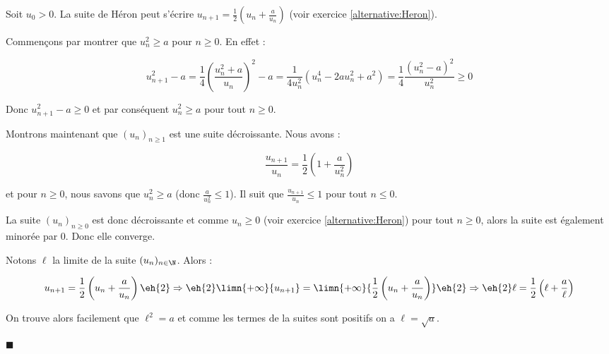\begin{demonstration}
\medskip
Soit $u_0>0.$ La suite de Héron peut s'écrire $u_{n+1} = \frac12 \left(u_n+\frac{a}{u_n}\right)$ {\small (voir exercice \ref*{alternative:Heron})}.

\smallskip
Commençons par montrer que $u_n^2 \geqslant a$ pour $n\geqslant 0$. En effet :

$$u_{n+1}^2-a = \frac14 \left(\frac{u_n^2 + a}{u_n}\right)^2 - a = \frac{1}{4u_n^2}(u_n^4-2au_n^2+a^2)=\frac14 \frac{(u_n^2-a)^2}{u_n^2}\geqslant 0$$

Donc $u_{n+1}^2 - a \geqslant 0$ et par conséquent $u_{n}^2 \geqslant a$ pour tout $n\geqslant 0$.

\medskip
Montrons maintenant que $(u_n)_{n\ge1}$ est une suite décroissante. Nous avons :

$$\frac{u_{n+1}}{u_n} = \frac12 \left(1+\frac{a}{u_n^2}\right)$$

\smallskip
et pour $n\geqslant 0$, nous savons que $u_n^2 \geqslant a$ (donc $\frac{a}{u_n^2}\leqslant 1$). Il suit que $\frac{u_{n+1}}{u_n} \leqslant 1$ pour tout $n\leqslant 0$.

\medskip
La suite $(u_n)_{n\ge0}$ est donc décroissante et comme $u_n\geqslant 0$ {\small (voir exercice \ref*{alternative:Heron})} pour tout $n\geqslant 0$, alors la suite est également minorée par $0$. Donc elle converge.\clearpage

\medskip
Notons $\ell$ la limite de la suite $(u_n)_{n\in\N}$. Alors :

\smallskip
$$ u_{n+1} = \frac12 \left(u_n+\frac{a}{u_n}\right) \eh{2}\Rightarrow\eh{2}
 \limn{+\infty}{u_{n+1}}= \limn{+\infty}{\frac12 \left(u_n+\frac{a}{u_n}\right)} \eh{2}\Rightarrow\eh{2} \ell = \frac12 \left(\ell+\frac{a}{\ell}\right)$$ 

On trouve alors facilement que  $\ell^2=a$ et comme les termes de la suites sont positifs on a $\ell = \sqrt{a}$.

\vspace{-3mm}
\hfill $\blacksquare$
\end{demonstration}




